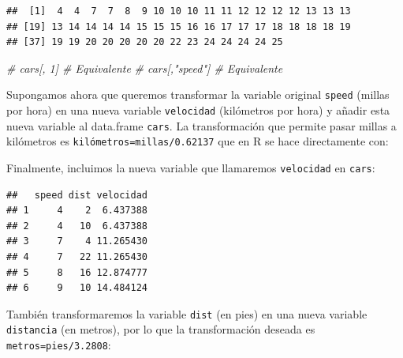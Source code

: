 \documentclass[
]{book}
\newenvironment{Shaded}{\begin{snugshade}}{\end{snugshade}}
\newcommand{\CommentTok}[1]{\textcolor[rgb]{0.56,0.35,0.01}{\textit{#1}}}
\newcommand{\DecValTok}[1]{\textcolor[rgb]{0.00,0.00,0.81}{#1}}
\newcommand{\FloatTok}[1]{\textcolor[rgb]{0.00,0.00,0.81}{#1}}
\newcommand{\FunctionTok}[1]{\textcolor[rgb]{0.13,0.29,0.53}{\textbf{#1}}}
\newcommand{\NormalTok}[1]{#1}
\newcommand{\OtherTok}[1]{\textcolor[rgb]{0.56,0.35,0.01}{#1}}
\newcommand{\SpecialCharTok}[1]{\textcolor[rgb]{0.81,0.36,0.00}{\textbf{#1}}}
\begin{document}
\begin{verbatim}
##  [1]  4  4  7  7  8  9 10 10 10 11 11 12 12 12 12 13 13 13
## [19] 13 14 14 14 14 15 15 15 16 16 17 17 17 18 18 18 18 19
## [37] 19 19 20 20 20 20 20 22 23 24 24 24 24 25
\end{verbatim}

\begin{Shaded}
\begin{Highlighting}[]
\CommentTok{\# cars[, 1]       \# Equivalente}
\CommentTok{\# cars[,"speed"]  \# Equivalente}
\end{Highlighting}
\end{Shaded}

Supongamos ahora que queremos transformar la variable original \texttt{speed}
(millas por hora) en una nueva variable \texttt{velocidad} (kilómetros por
hora) y añadir esta nueva variable al data.frame \texttt{cars}.
La transformación que permite pasar millas a kilómetros es
\texttt{kilómetros=millas/0.62137} que en R se hace directamente con:

\begin{Shaded}
\end{Shaded}

Finalmente, incluimos la nueva variable que llamaremos
\texttt{velocidad} en \texttt{cars}:

\begin{Shaded}
\end{Shaded}

\begin{verbatim}
##   speed dist velocidad
## 1     4    2  6.437388
## 2     4   10  6.437388
## 3     7    4 11.265430
## 4     7   22 11.265430
## 5     8   16 12.874777
## 6     9   10 14.484124
\end{verbatim}

También transformaremos la variable \texttt{dist} (en pies) en una nueva
variable \texttt{distancia} (en metros), por lo que la transformación deseada es
\texttt{metros=pies/3.2808}:
\end{document}
